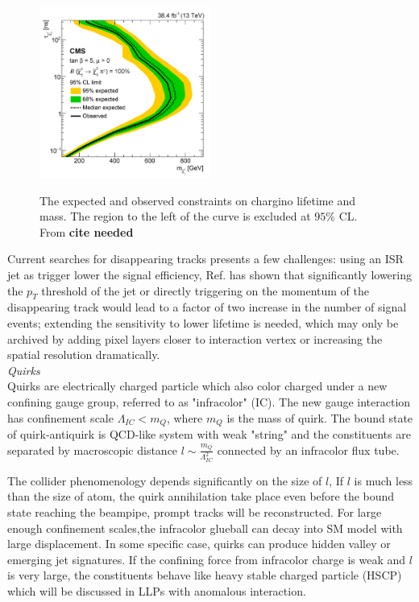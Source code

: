 \begin{figure}[!htbp]
    \centering
    \caption{The expected and observed constraints on chargino lifetime and mass. The region to the left of the curve is excluded at $95\%$ CL. From \textbf{cite needed}}
    \includegraphics[width=0.5\textwidth]{fig/CMSDisappearingTrack2018.png}
    \label{fig:CMSDisappearingTrack2018}
\end{figure} 

Current searches for disappearing tracks presents a few challenges: using an ISR jet as trigger lower the signal efficiency, Ref.\cite{DisappearingTrackWindow} has shown that significantly lowering the $p_T$ threshold of the jet or directly triggering on the momentum of the disappearing track would lead to a factor of two increase in the number of signal events; extending the sensitivity to lower lifetime is needed, which may only be archived by adding pixel layers closer to interaction vertex or increasing the spatial resolution dramatically. \\


\textit{Quirks}\\

Quirks are electrically charged particle which also color charged under a new confining gauge group, referred to as "infracolor" (IC). The new gauge interaction has confinement scale $\Lambda_{IC} < m_Q$, where $m_Q$ is the mass of quirk. The bound state of quirk-antiquirk is QCD-like system with weak "string" and the constituents are separated by macroscopic distance $l \sim \frac{m_Q}{\Lambda^2_{IC}}$ connected by an infracolor flux tube.

The collider phenomenology depends significantly on the size of $l$, If $l$ is much less than the size of atom, the quirk annihilation take place even before the bound state reaching the beampipe, prompt tracks will be reconstructed. For large enough confinement scales,the infracolor glueball can decay into SM model with large displacement. In some specific case, quirks can produce hidden valley or emerging jet signatures. If the confining force from infracolor charge is weak and $l$ is very large, the constituents behave like heavy stable charged particle (HSCP) which will be discussed in LLPs with anomalous interaction.

